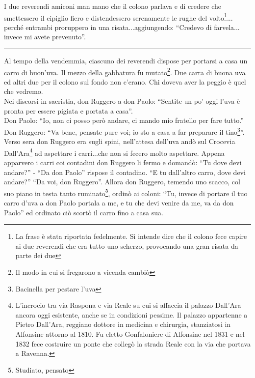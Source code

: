 \documentclass[10pt]{memoir} %
\begin{document}
I due reverendi amiconi man mano che il colono parlava e di credere che smettessero il cipiglio fiero e distendessero serenamente le rughe del volto\footnote{La frase è stata riportata fedelmente. Si intende dire che il colono fece capire ai due reverendi che era tutto uno scherzo, provocando una gran risata da parte dei due}... perché entrambi proruppero in una risata...aggiungendo: “Credevo di farvela... invece mi avete prevenuto”.
\begin{center}
\rule{1.5cm}{0.4pt}
\end{center}
Al tempo della vendemmia, ciascuno dei reverendi dispose per portarsi a casa un carro di buon’uva. Il mezzo della gabbatura fu mutato\footnote{Il modo in cui si fregarono a vicenda cambiò}. Due carra di buona uva ed altri due per il colono sul fondo non c’erano. Chi doveva aver la peggio è quel che vedremo. \\
Nei discorsi in sacristia, don Ruggero a don Paolo: “Sentite un po' oggi l’uva è pronta per essere pigiata e portata a casa”.\\
Don Paolo: “Io, non ci posso però andare, ci mando mio fratello per fare tutto.”\\
Don Ruggero: “Va bene, pensate pure voi; io sto a casa a far preparare il tino\footnote{Bacinella per pestare l'uva}”.\\
Verso sera don Ruggero era sugli spini, nell’attesa dell’uva andò sul Crocevia Dall’Ara\footnote{L'incrocio tra via Raspona e via Reale su cui si affaccia il palazzo Dall'Ara ancora oggi esistente, anche se in condizioni pessime. Il palazzo appartenne a Pietro Dall'Ara, reggiano dottore in medicina e chirurgia, stanziatosi in Alfonsine attorno al 1810. Fu eletto Gonfaloniere di Alfonsine nel 1831 e nel 1832 fece costruire un ponte che collegò la strada Reale con la via che portava a Ravenna.} ad aspettare i carri...che non si fecero molto aspettare. Appena apparvero i carri coi contadini don Ruggero li fermo e domandò: “Tu dove devi andare?” - “Da don Paolo” rispose il contadino. “E tu dall’altro carro, dove devi andare?” “Da voi, don Ruggero”. Allora don Ruggero, temendo uno scacco, col suo piano in testa tanto ruminato\footnote{Studiato, pensato}, ordinò ai coloni: “Tu, invece di portare il tuo carro d’uva a don Paolo portala a me, e tu che devi venire da me, va da don Paolo” ed ordinato ciò scortò il carro fino a casa sua.\\
\end{document}
